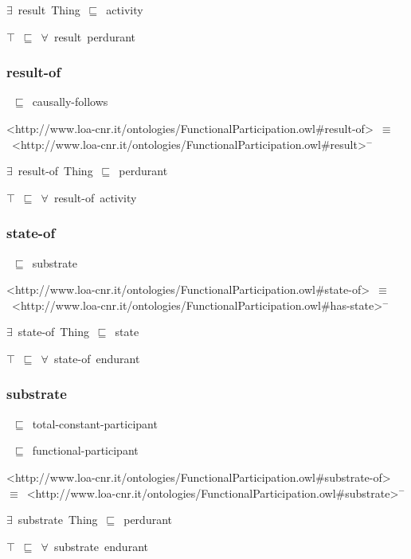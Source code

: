 \documentclass{article}
\begin{document}
\ensuremath{\exists}~result~Thing~\ensuremath{\sqsubseteq}~activity

\ensuremath{\top}~\ensuremath{\sqsubseteq}~\ensuremath{\forall}~result~perdurant

\subsubsection*{result-of}

~\ensuremath{\sqsubseteq}~causally-follows

<http://www.loa-cnr.it/ontologies/FunctionalParticipation.owl#result-of>~\ensuremath{\equiv}~<http://www.loa-cnr.it/ontologies/FunctionalParticipation.owl#result>\ensuremath{^-}

\ensuremath{\exists}~result-of~Thing~\ensuremath{\sqsubseteq}~perdurant

\ensuremath{\top}~\ensuremath{\sqsubseteq}~\ensuremath{\forall}~result-of~activity

\subsubsection*{state-of}

~\ensuremath{\sqsubseteq}~substrate

<http://www.loa-cnr.it/ontologies/FunctionalParticipation.owl#state-of>~\ensuremath{\equiv}~<http://www.loa-cnr.it/ontologies/FunctionalParticipation.owl#has-state>\ensuremath{^-}

\ensuremath{\exists}~state-of~Thing~\ensuremath{\sqsubseteq}~state

\ensuremath{\top}~\ensuremath{\sqsubseteq}~\ensuremath{\forall}~state-of~endurant

\subsubsection*{substrate}

~\ensuremath{\sqsubseteq}~total-constant-participant

~\ensuremath{\sqsubseteq}~functional-participant

<http://www.loa-cnr.it/ontologies/FunctionalParticipation.owl#substrate-of>~\ensuremath{\equiv}~<http://www.loa-cnr.it/ontologies/FunctionalParticipation.owl#substrate>\ensuremath{^-}

\ensuremath{\exists}~substrate~Thing~\ensuremath{\sqsubseteq}~perdurant

\ensuremath{\top}~\ensuremath{\sqsubseteq}~\ensuremath{\forall}~substrate~endurant
\end{document}
